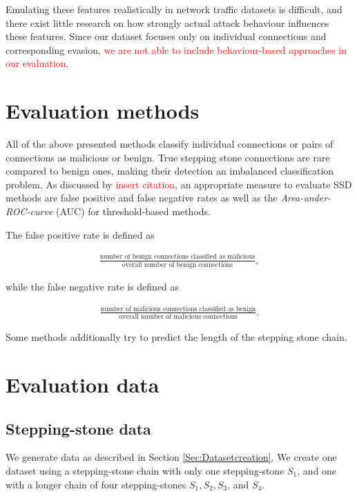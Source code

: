 \documentclass[conference]{IEEEtran}\usepackage[]{graphicx}\usepackage[]{color}
\begin{document}
Emulating these features realistically in network traffic datasets is difficult, and there exist little research on how strongly actual attack behaviour influences these features. Since our dataset focuses only on individual connections and corresponding evasion, \textcolor{red}{we are not able to include behaviour-based approaches in our evaluation}.




\section{Evaluation methods}

All of the above presented methods classify individual connections or pairs of connections as malicious or benign. True stepping stone connections are rare compared to benign ones, making their detection an imbalanced classification problem. As discussed by \textcolor{red}{insert citation}, an appropriate measure to evaluate SSD methods are false positive and false negative rates as well as the \textit{Area-under-ROC-curve} (AUC) for threshold-based methods.

The false positive rate is defined as

\begin{align*}
\frac{\text{number of benign connections classified as malicious}}{\text{overall number of benign connections}},
\end{align*}

while the false negative rate is defined as

\begin{align*}
\frac{\text{number of malicious connections classified as benign}}{\text{overall number of malicious connections}}.
\end{align*}

Some methods additionally try to predict the length of the stepping stone chain. 


\section{Evaluation data}


\subsection{Stepping-stone data}

We generate data as described in Section \ref{Sec:Datasetcreation}. We create one dataset using a stepping-stone chain with only one stepping-stone $S_1$, and one with a longer chain of four stepping-stones $S_1, S_2, S_3$, and $S_4$. 
\end{document}
